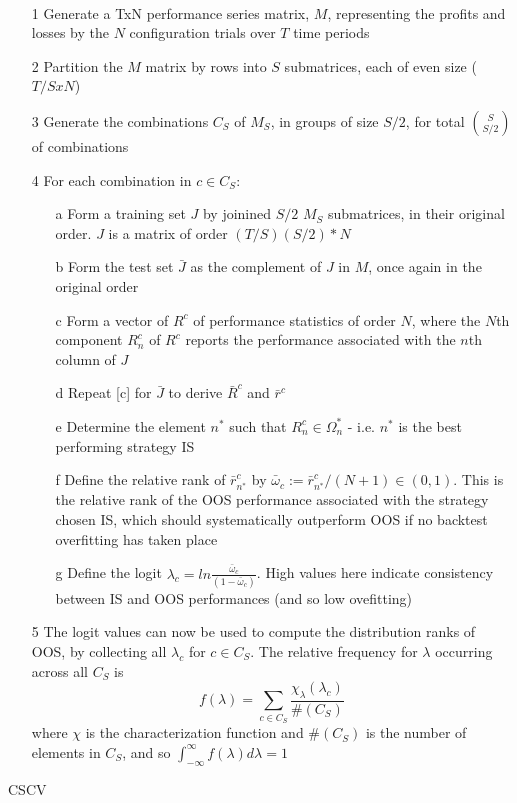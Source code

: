 \documentclass[a4paper,11pt,oneside]{article}
\theoremstyle{plain}
\theoremstyle{definition}
\begin{document}
\begin{algorithm}[H]
	\texttt{\\}
		
	\begin{itemize}
			\item[1]Generate a TxN performance series matrix, $M$, representing the profits and losses by the $N$ configuration trials over $T$ time periods
			\item[2]Partition the $M$ matrix by rows into $S$ submatrices, each of even size ($T/S x N$)
			\item[3]Generate the combinations $C_S$ of $M_S$, in groups of size $S/2$, for total $\binom{S}{S/2}$ of combinations
			\item[4]For each combination in $c \in C_S$:
			\begin{itemize}
				\item [a] Form a training set $J$ by joinined $S/2$ $M_S$ submatrices, in their original order. $J$ is a matrix of order $(T/S)(S/2)*N $
				\item [b] Form the test set $\bar{J}$ as the complement of $J$ in $M$, once again in the original order
				\item [c] Form a vector of $R^c$ of performance statistics of order $N$, where the $N$th component $R_n^c$ of $R^c$ reports the performance associated with the $n$th column of $J$
				\item [d] Repeat [c] for $\bar{J}$ to derive $\bar{R}^c$ and $\bar{r}^c$
				\item [e] Determine the element $n^*$ such that $R^c_n \in \Omega^*_n$ - i.e. $n^*$ is the best performing strategy IS
				\item [f] Define the relative rank of $\bar{r}^c_{n^*}$ by $\bar{\omega}_c := \bar{r}^c_{n^*} / (N +1) \in (0,1)$. This is the relative rank of the OOS performance associated with the strategy chosen IS, which should systematically outperform OOS if no backtest overfitting has taken place
				\item[g] Define the logit $\lambda_c = ln \frac{\bar{\omega}_c}{(1-\bar{\omega}_c)}$. High values here indicate consistency between IS and OOS performances (and so low ovefitting)
			\end{itemize}
			\item [5] The logit values can now be used to compute the distribution ranks of OOS, by collecting all $\lambda_c$ for $c \in C_S$. The relative frequency for $\lambda$ occurring across all $C_S$ is 
			\begin{equation}
			f(\lambda) = \sum_{c \in C_S}\frac{\chi_{\lambda}(\lambda_c)}{\#(C_S)}
			\end{equation}
			where $\chi$ is the characterization function and $\#(C_S)$ is the number of elements in $C_S$, and so $\int_{-\infty}^{\infty} f (\lambda) d \lambda = 1$
		\end{itemize}
	
	\label{algo_cscv}
	\caption{CSCV}
\end{algorithm}
\end{document}
